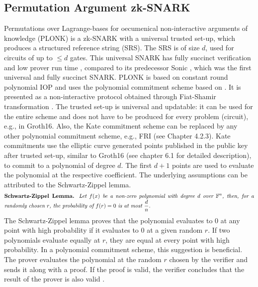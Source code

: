 \subsection{Permutation Argument zk-SNARK}
Permutations over Lagrange-bases for oecumenical non-interactive arguments of knowledge (PLONK) is a zk-SNARK with a universal trusted set-up, which produces a structured reference string (SRS). The SRS is of size \(d\), used for circuits of up to \(\leq d\) gates. This universal SNARK has fully succinct verification and low prover run time \citep{PLONKcryptoeprint:2019/953}, compared to its predecessor Sonic \citep{SONIC10.1145/3319535.3339817}, which was the first universal and fully succinct SNARK. PLONK is based on constant round polynomial IOP and uses the polynomial commitment scheme based on \citet{Kate2010ConstantSizeCT}. It is presented as a non-interactive protocol obtained through Fiat-Shamir transformation \citep{PLONKcryptoeprint:2019/953}. The trusted set-up is universal and updatable: it can be used for the entire scheme and does not have to be produced for every problem (circuit), e.g., in Groth16. Also, the Kate commitment scheme can be replaced by any other polynomial commitment scheme, e.g., FRI (see Chapter 4.2.3). 
Kate commitments use the elliptic curve generated points published in the public key after trusted set-up, similar to Groth16 (see chapter 6.1 for detailed description), to commit to a polynomial of degree \(d\). The first \(d+1\) points are used to evaluate the polynomial at the respective coefficient. The underlying assumptions can be attributed to the Schwartz-Zippel lemma.
\begin{align*}
    \text{\parbox{450pt}{\textbf{Schwartz-Zippel Lemma.} \textit{Let \(f(x)\) be a non-zero polynomial with degree \(d\) over \begin{math}\mathbb{F}^n\end{math}, then, for a randomly chosen \(r\), the probability of \(f(r) = 0\) is at most \(\frac{d}{n}\).}}}
\end{align*}
The Schwartz-Zippel lemma proves that the polynomial evaluates to 0 at any point with high probability if it evaluates to 0 at a given random \(r\). If two polynomials evaluate equally at \(r\), they are equal at every point with high probability. In a polynomial commitment scheme, this suggestion is beneficial. The prover evaluates the polynomial at the random \(r\) chosen by the verifier and sends it along with a proof. If the proof is valid, the verifier concludes that the result of the prover is also valid \citep{Kate2010ConstantSizeCT}.

